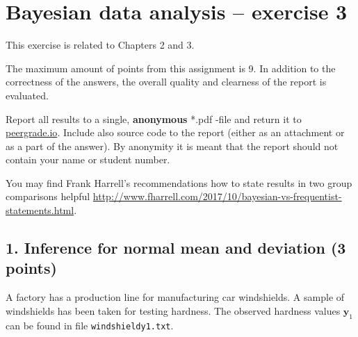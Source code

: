 \documentclass[a4paper,11pt]{article}
\begin{document}
\thispagestyle{empty}

\section*{Bayesian data analysis -- exercise 3}

This exercise is related to Chapters 2 and 3.

The maximum amount of points from this assignment is 9. In addition to the correctness of the answers, the overall quality and clearness of the report is evaluated.

Report all results to a single, {\bf anonymous} *.pdf -file and return it to \href{peergrade.io}{peergrade.io}. Include also source code to the report (either as an attachment or as a part of the answer). By anonymity it is meant that the report should not contain your name or student number.

\vspace{1cm}

You may find Frank Harrell's recommendations how to state results in
two group comparisons helpful
\url{http://www.fharrell.com/2017/10/bayesian-vs-frequentist-statements.html}.

\subsection*{1. Inference for normal mean and deviation (3 points)}

A factory has a production line for manufacturing car windshields. 
A sample of windshields has been taken for testing hardness. The
observed hardness values $\mathbf{y}_1$ can be found in file 
{\tt windshieldy1.txt}.
\end{document}
